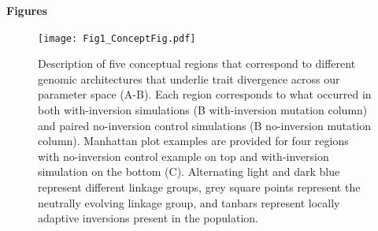 \documentclass[10pt, scrartlc]{article}
\begin{document}
\pagecolor{white}

\begin{center}
{ \Large \bf Figures }
\end{center}

\listoffigures

\clearpage
\newpage

\begin{figure}[h]
	\begin{center}
		\texttt{[image: Fig1\_ConceptFig.pdf]}
	\end{center}
	\caption[Genomic Basis of Local Adaptation Regions]{Description of five conceptual regions that correspond to different genomic architectures that underlie trait divergence across our parameter space (A-B). Each region corresponds to what occurred in both with-inversion simulations (B with-inversion mutation column) and paired no-inversion control simulations (B no-inversion mutation column). Manhattan plot examples are provided for four regions with no-inversion control example on top and with-inversion simulation on the bottom (C). Alternating light and dark blue represent different linkage groups, grey square points represent the neutrally evolving linkage group, and tanbars represent locally adaptive inversions present in the population. }
\end{figure}

\clearpage
\newpage
\end{document}
